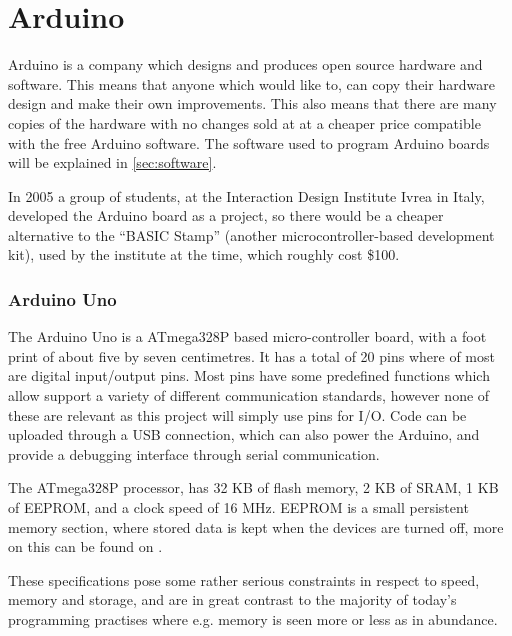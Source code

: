 
\section{Arduino}\label{sec:arduino}
Arduino is a company which designs and produces open source hardware and software.
This means that anyone which would like to, can copy their hardware design and make their own improvements.
This also means that there are many copies of the hardware with no changes sold at at a cheaper price compatible with the free Arduino software.
The software used to program Arduino boards will be explained in \ref{sec:software}.

\begin{tcolorbox}[floatplacement=b,float,colback=white!5,colframe=aaublue!50,title=The Birth of the Arduino \cite{birthofarduino}.]
In 2005 a group of students, at the Interaction Design Institute Ivrea in Italy, developed the Arduino board as a project, so there would be a cheaper alternative to the ``BASIC Stamp'' (another microcontroller-based development kit), used by the institute at the time, which roughly cost \$100.
\end{tcolorbox}

\subsubsection{Arduino Uno}
The Arduino Uno is a ATmega328P based micro-controller board, with a foot print of about five by seven centimetres.
It has a total of 20 pins where of most are digital input/output pins.
Most pins have some predefined functions which allow support a variety of different communication standards, however none of these are relevant as this project will simply use pins for I/O.
Code can be uploaded through a USB connection, which can also power the Arduino, and provide a debugging interface through serial communication. 

The ATmega328P processor, has 32 KB of flash memory, 2 KB of SRAM, 1 KB of EEPROM, and a clock speed of 16 MHz.
EEPROM is a small persistent memory section, where stored data is kept when the devices are turned off, more on this can be found on \cite{EEPROM}.

These specifications pose some rather serious constraints in respect to speed, memory and storage, and are in great contrast to the majority of today's programming practises where e.g. memory is seen more or less as in abundance.